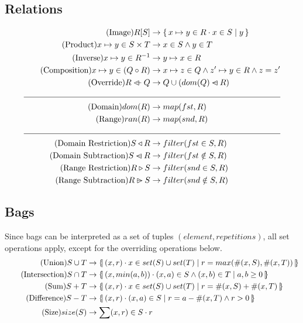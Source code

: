 \documentclass{article}
\newcommand{\bSet}[3]{%
  \{\, #1 \cdot #2 \mid #3 \, \}%
}
\newcommand{\lbbar}{\{\kern-0.5ex|}
\newcommand{\rbbar}{|\kern-0.5ex\}}
\newcommand{\bag}[3]{%
  \lbbar \, #1 \cdot #2 \mid #3 \, \rbbar%
}
\begin{document}
\subsection{Relations}
  \begin{align}
  \tag{Image}
  R[S] &\rightarrow \bSet{x \mapsto y \in R}{x \in S}{y}
  \\
  \tag{Product}
  x \mapsto y \in S \times T &\rightarrow x \in S \land y \in T
  \\
  \tag{Inverse}
  x \mapsto y \in R^{-1} &\rightarrow y \mapsto x \in R
  \\
  \tag{Composition}
  x \mapsto y \in (Q \circ R) &\rightarrow x \mapsto z \in Q \land z' \mapsto y \in R \land z=z'
  \\
  \tag{Override}
  R \ovl Q &\rightarrow Q \cup (dom(Q) \domsub R)
  \\
  \cline{1-2}
  \tag{Domain}
  dom(R) &\rightarrow map(fst, R)
  \\
  \tag{Range}
  ran(R) &\rightarrow map(snd, R)
  \\
  \cline{1-2}
  \tag{Domain Restriction}
  S \triangleleft R &\rightarrow filter(fst \in S, R)
  \\
  \tag{Domain Subtraction}
  S \domsub R &\rightarrow filter(fst \notin S, R)
  \\
  \tag{Range Restriction}
  R \triangleright S &\rightarrow filter(snd \in S, R)
  \\
  \tag{Range Subtraction}
  R \ransub S &\rightarrow filter(snd \notin S, R)
\end{align}

\subsection{Bags}
Since bags can be interpreted as a set of tuples $(element, repetitions)$, all set operations apply, except for the overriding operations below.
\begin{align}
  \tag{Union}
  S \cup T &\rightarrow \bag{(x, r)}{x \in set(S) \cup set(T)}{r = max(\#(x,S), \#(x,T))}
  \\
  \tag{Intersection}
  S \cap T &\rightarrow \bag{(x, min(a,b))}{(x,a) \in S \land (x,b) \in T}{a, b \geq 0}
  \\
  \tag{Sum}
  S + T &\rightarrow \bag{(x, r)}{x \in set(S) \cup set(T)}{r = \#(x,S) + \#(x, T)}
  \\
  \tag{Difference}
  S - T &\rightarrow \bag{(x, r)}{(x,a) \in S}{r = a-\#(x, T) \land r > 0}
  \\
  \tag{Size}
  size(S) &\rightarrow \sum (x,r) \in S \cdot r
\end{align}
\end{document}
